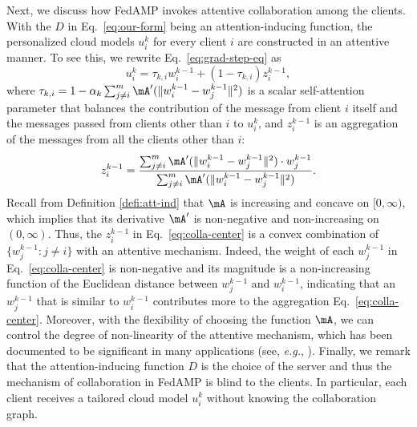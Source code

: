 {Next, we discuss how {FedAMP} invokes attentive collaboration among the clients. With the $D$ in Eq.~\eqref{eq:our-form} being an attention-inducing function, the personalized cloud models $u_i^k$ for every client $i$ are constructed in an attentive manner. To see this, we rewrite Eq.~\eqref{eq:grad-step-eq} as
\begin{equation}
\label{eq:grad-step-cvx-combi}
u_i^k = \tau_{k,i}w_i^{k-1} + (1-\tau_{k,i})z_i^{k-1},
\end{equation}
where $\tau_{k,i} = 1 - \alpha_k\sum_{j\neq i}^m \mA^\prime(\|w_i^{k-1} - w_j^{k-1}\|^2)$ is a scalar self-attention parameter that balances the contribution of the message from client $i$ itself and the messages passed from clients other than $i$ to $u_i^k$, and $z_i^{k-1}$ is an aggregation of the messages from all the clients other than $i$:
\begin{equation}
\label{eq:colla-center}
z_i^{k-1} = \frac{\sum_{j\neq i}^m \mA^\prime(\|w_i^{k-1} - w_j^{k-1}\|^2)\cdot w_j^{k-1}}{\sum_{j\neq i}^m \mA^\prime(\|w_i^{k-1} - w_j^{k-1}\|^2)}.
\end{equation}
Recall from Definition \ref{defi:att-ind} that $\mA$ is increasing and concave on $[0,\infty)$, which implies that its derivative $\mA^\prime$ is non-negative and non-increasing on $(0,\infty)$. Thus, the $z_i^{k-1}$ in Eq.~\eqref{eq:colla-center} is a convex combination of $\{w_j^{k-1}: j\neq i\}$ with an attentive mechanism. Indeed, the weight of each $w_j^{k-1}$ in Eq.~\eqref{eq:colla-center} is non-negative and its magnitude is a non-increasing function of the Euclidean distance between $w_j^{k-1}$ and $w_i^{k-1}$, indicating that an $w_j^{k-1}$ that is similar to $w_i^{k-1}$ contributes more to the aggregation Eq.~\eqref{eq:colla-center}. Moreover, with the flexibility of choosing the function $\mA$, we can control the degree of non-linearity of the attentive mechanism, which has been documented to be significant in many applications (see, {\it e.g.}, \cite{sabour2017dynamic}). Finally, we remark that the attention-inducing function $D$ is the choice of the server and thus the mechanism of collaboration in {FedAMP} is blind to the clients. In particular, each client receives a tailored cloud model $u_i^k$ without knowing the collaboration graph. 
}

